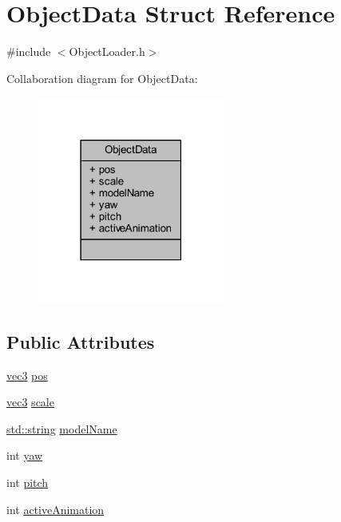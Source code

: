 \hypertarget{struct_object_data}{}\section{Object\+Data Struct Reference}
\label{struct_object_data}


{\ttfamily \#include $<$Object\+Loader.\+h$>$}



Collaboration diagram for Object\+Data\+:\nopagebreak
\begin{figure}[H]
\begin{center}
\leavevmode
\includegraphics[width=174pt]{struct_object_data__coll__graph}
\end{center}
\end{figure}
\subsection*{Public Attributes}
\begin{DoxyCompactItemize}
\item 
\hyperlink{_types_8h_a3d0ce73e3199de81565fb01632415288}{vec3} \hyperlink{struct_object_data_aeb9bfcc1a43824ac59233da2ed0909e6}{pos}
\item 
\hyperlink{_types_8h_a3d0ce73e3199de81565fb01632415288}{vec3} \hyperlink{struct_object_data_ab9944e8519f068949e46414db9e619e2}{scale}
\item 
\hyperlink{_types_8h_ad453f9f71ce1f9153fb748d6bb25e454}{std\+::string} \hyperlink{struct_object_data_a50cebd94c06bce02597ab7524dc10968}{model\+Name}
\item 
int \hyperlink{struct_object_data_a130d0b0e19b50e6e58ad1d9c54affd45}{yaw}
\item 
int \hyperlink{struct_object_data_a9df49c33adc12c93b5da48f0a517ba34}{pitch}
\item 
int \hyperlink{struct_object_data_a501c56b0aecd2f1a0fffc319a940af07}{active\+Animation}
\end{DoxyCompactItemize}


